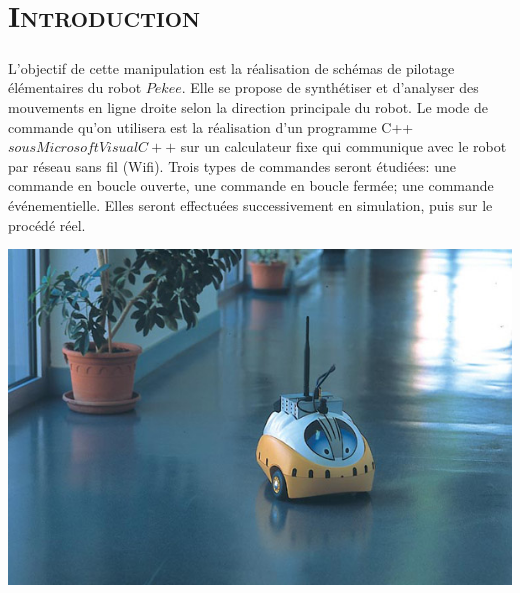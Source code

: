 \chapter*{\textsc{Introduction}}

	\paragraph{}
	L'objectif de cette manipulation est la réalisation de schémas de pilotage élémentaires du robot $Pekee$. Elle se propose de synthétiser et d'analyser des mouvements en ligne droite selon la direction principale du robot. Le mode de commande qu'on utilisera est la réalisation d'un programme C++ $ sous Microsoft Visual C++ $ sur un calculateur fixe qui communique avec le robot par réseau sans fil (Wifi). Trois types de commandes seront étudiées: une commande en boucle ouverte, une commande en boucle fermée; une commande événementielle. Elles seront effectuées successivement en simulation, puis sur le procédé réel. 
	
	\begin{center}
	\includegraphics[scale=0.5]{pekee1.jpg}
	\label{fig1} 
	\end{center}   